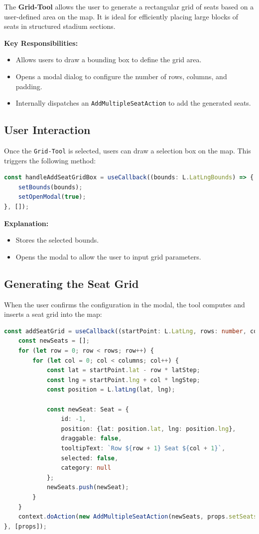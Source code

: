 The \textbf{Grid-Tool} allows the user to generate a rectangular grid of seats based on a user-defined area on the map. It is ideal for efficiently placing large blocks of seats in structured stadium sections.

\textbf{Key Responsibilities:}
\begin{itemize}
    \item Allows users to draw a bounding box to define the grid area.
    \item Opens a modal dialog to configure the number of rows, columns, and padding.
    \item Internally dispatches an \texttt{AddMultipleSeatAction} to add the generated seats.
\end{itemize}

\subsection{User Interaction}
Once the \texttt{Grid-Tool} is selected, users can draw a selection box on the map. This triggers the following method:

\begin{lstlisting}[language=TypeScript, caption=Handling Box Selection, label=lst:grid-handle-box]
const handleAddSeatGridBox = useCallback((bounds: L.LatLngBounds) => {
    setBounds(bounds);
    setOpenModal(true);
}, []);
\end{lstlisting}

\textbf{Explanation:}
\begin{itemize}
    \item Stores the selected bounds.
    \item Opens the modal to allow the user to input grid parameters.
\end{itemize}

\subsection{Generating the Seat Grid}
When the user confirms the configuration in the modal, the tool computes and inserts a seat grid into the map:

\begin{lstlisting}[language=TypeScript, caption=Add Grid Logic, label=lst:grid-add-seat-logic]
const addSeatGrid = useCallback((startPoint: L.LatLng, rows: number, columns: number, latStep: number, lngStep: number) => {
    const newSeats = [];
    for (let row = 0; row < rows; row++) {
        for (let col = 0; col < columns; col++) {
            const lat = startPoint.lat - row * latStep;
            const lng = startPoint.lng + col * lngStep;
            const position = L.latLng(lat, lng);

            const newSeat: Seat = {
                id: -1,
                position: {lat: position.lat, lng: position.lng},
                draggable: false,
                tooltipText: `Row ${row + 1} Seat ${col + 1}`,
                selected: false,
                category: null
            };
            newSeats.push(newSeat);
        }
    }
    context.doAction(new AddMultipleSeatAction(newSeats, props.setSeats))
}, [props]);
\end{lstlisting}

